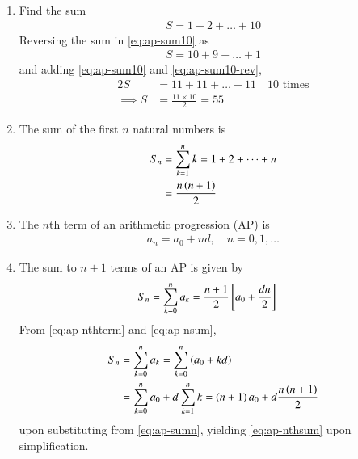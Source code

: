 \begin{enumerate}[label=\thesubsection.\arabic*,ref=\thesubsection.\theenumi]
	\item Find the sum
\begin{align}
	\label{eq:ap-sum10}
	S = 1 + 2 + \dots + 10
\end{align}
\solution Reversing the sum in
	\eqref{eq:ap-sum10}
	as
\begin{align}
	\label{eq:ap-sum10-rev}
	S = 10 + 9 + \dots + 1
\end{align}
and adding 
	\eqref{eq:ap-sum10}
	and
	\eqref{eq:ap-sum10-rev},
\begin{align}
	\label{eq:ap-sum10-add}
	2S &= 11 + 11 + \dots + 11 \quad 10 \text{ times}
	\\
	\implies S &= \frac{11 \times 10}{2} = 55
\end{align}
\item The sum of the first $n$ natural numbers is
\begin{align}
	S_n &= \sum_{k=1}^{n}k = 1+ 2 + \dots + n
	\\
	&= \frac{n\left(n+1\right)}{2}
	\label{eq:ap-sumn}
\end{align}
\item The $n$th term of an arithmetic progression (AP) is
\begin{align}
	\label{eq:ap-nthterm}
	a_n = a_0 + nd, \quad n = 0, 1, \dots
\end{align}
\item The sum to $n+1$ terms of an AP is given by
\begin{align}
	\label{eq:ap-nsum}
	S_n &= \sum_{k=0}^{n}a_k = \frac{n+1}{2}{}\left[a_0 + \frac{dn}{2}\right]
\end{align}
\solution
From
	\eqref{eq:ap-nthterm}
	and
	\eqref{eq:ap-nsum},
\begin{align}
	\label{eq:ap-nthsum}
	S_n &= \sum_{k=0}^{n}a_k = 
\sum_{k=0}^{n}
	 \left(a_0 + kd\right) 
	 \\
	 &= 
\sum_{k=0}^{n}a_0 + 
d\sum_{k=1}^{n}k
	  = \left(n+1\right)a_0 + d\frac{n\left(n+1\right)}{2}
\end{align}
upon substituting from
	\eqref{eq:ap-sumn}, yielding
	\eqref{eq:ap-nthsum}
	upon simplification.
\end{enumerate}

